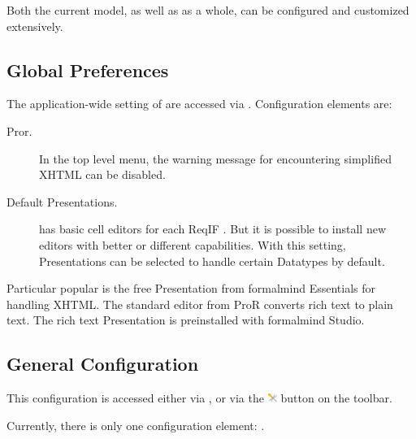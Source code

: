 Both the current model, as well as \pror{} as a whole, can be configured and customized extensively.

\subsection{Global Preferences}

The application-wide setting of \pror{} are accessed via .  Configuration elements are:

\begin{description}
\item[Pror.] In the top level menu, the warning message for encountering simplified XHTML can be disabled.
\item[Default Presentations.] \pror{} has basic cell editors for each ReqIF .  But it is possible to install new editors with better or different capabilities.  With this setting, Presentations can be selected to handle certain Datatypes by default.
\end{description}

\begin{info}
Particular popular is the free Presentation from formalmind Essentials for handling XHTML.  The standard editor from ProR converts rich text to plain text.  The rich text Presentation is preinstalled with formalmind Studio.
\end{info}

\subsection{General Configuration}
\label{sec:general_configuration}

This configuration is accessed either via , or
via the \includegraphics[height=0.8em]{../rmf-images/ReqIFUIToolExtension.png} button on the toolbar.

Currently, there is only one configuration element: .

